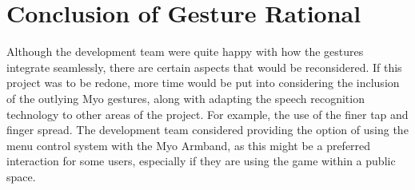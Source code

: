 \documentclass{article}
\begin{document}
\clearpage

\section{Conclusion of Gesture Rational}

Although the development team were quite happy with how the gestures integrate seamlessly, there are certain aspects that would be reconsidered. If this project was to be redone, more time would be put into considering the inclusion of the outlying Myo gestures, along with adapting the speech recognition technology to other areas of the project. For example, the use of the finer tap and finger spread. The development team considered providing the option of using the menu control system with the Myo Armband, as this might be a preferred interaction for some users, especially if they are using the game within a public space. 
\end{document}
